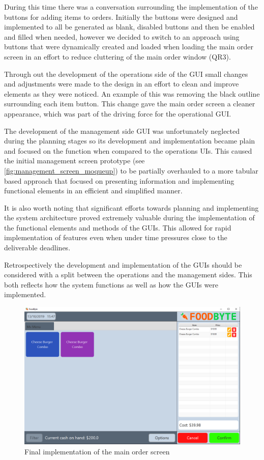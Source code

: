 During this time there was a conversation surrounding the implementation of the buttons for adding items to orders. Initially the buttons were designed and implemented to all be generated as blank, disabled buttons and then be enabled and filled when needed, however we decided to switch to an approach using buttons that were dynamically created and loaded when loading the main order screen in an effort to reduce cluttering of the main order window (QR3).

Through out the development of the operations side of the GUI small changes and adjustments were made to the design in an effort to clean and improve elements as they were noticed. An example of this was removing the black outline surrounding each item button. This change gave the main order screen a cleaner appearance, which was part of the driving force for the operational GUI.

The development of the management side GUI was unfortunately neglected during the planning stages so its development and implementation became plain and focused on the function when compared to the operations UIs. This caused the initial management screen prototype (see \ref{fig:management_screen_moqueup}) to be partially overhauled to a more tabular based approach that focused on presenting information and implementing functional elements in an efficient and simplified manner.

It is also worth noting that significant efforts towards planning and implementing the system architecture proved extremely valuable during the implementation of the functional elements and methods of the GUIs. This allowed for rapid implementation of features even when under time pressures close to the deliverable deadlines.

Retrospectively the development and implementation of the GUIs should be considered with a split between the operations and the management sides. This both reflects how the system functions as well as how the GUIs were implemented. 

\begin{figure}[ht]
	\centering
	\includegraphics[width=150mm]{images/Final_GUI/main_order_screen.png}
	\caption{Final implementation of the main order screen}
	\label{fig:final_order_screen}
\end{figure}

